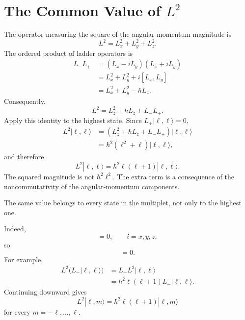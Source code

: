 \section{The Common Value of \texorpdfstring{\(L^2\)}{L squared}}

The operator measuring the square of the angular-momentum magnitude is
\begin{equation}
L^2=L_x^2+L_y^2+L_z^2.
\end{equation}
The ordered product of ladder operators is
\begin{align}
L_-L_+
&=(L_x-iL_y)(L_x+iL_y) \\
&=L_x^2+L_y^2+i[L_x,L_y] \\
&=L_x^2+L_y^2-\hbar L_z.
\end{align}
Consequently,
\begin{equation}
L^2=L_z^2+\hbar L_z+L_-L_+.
\end{equation}
Apply this identity to the highest state. Since \(L_+|\ell,\ell\rangle=0\),
\begin{align}
L^2|\ell,\ell\rangle
&=\left(L_z^2+\hbar L_z+L_-L_+\right)|\ell,\ell\rangle \\
&=\hbar^2\left(\ell^2+\ell\right)|\ell,\ell\rangle,
\end{align}
and therefore
\begin{equation}
L^2|\ell,\ell\rangle
=\hbar^2\ell(\ell+1)|\ell,\ell\rangle.
\end{equation}
The squared magnitude is not \(\hbar^2\ell^2\). The extra term is a consequence of the noncommutativity of the angular-momentum components.

The same value belongs to every state in the multiplet, not only to the highest one.

\begin{classroomqa}
\end{classroomqa}

Indeed,
\begin{equation}
[L^2,L_i]=0,
\qquad i=x,y,z,
\end{equation}
so
\begin{equation}
[L^2,L_\pm]=0.
\end{equation}
For example,
\begin{align}
L^2\bigl(L_-|\ell,\ell\rangle\bigr)
&=L_-L^2|\ell,\ell\rangle \\
&=\hbar^2\ell(\ell+1)L_-|\ell,\ell\rangle.
\end{align}
Continuing downward gives
\begin{equation}
L^2|\ell,m\rangle
=\hbar^2\ell(\ell+1)|\ell,m\rangle
\end{equation}
for every \(m=-\ell,\ldots,\ell\).

